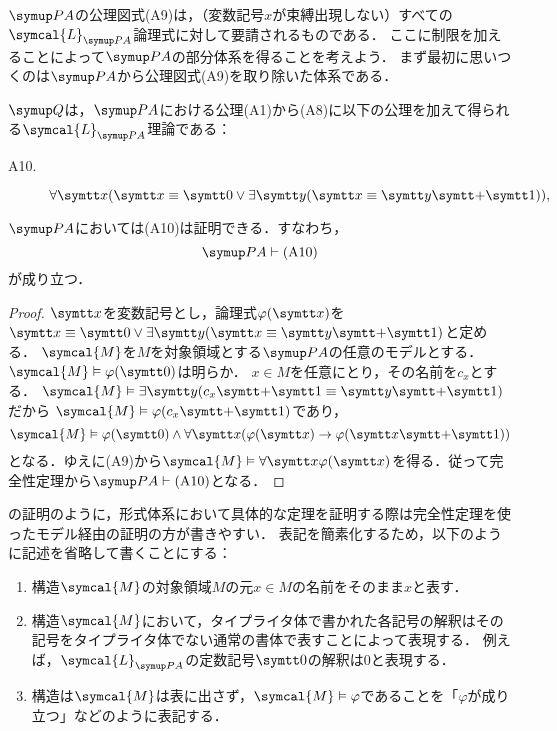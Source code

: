 \(\PA\)の公理図式(A9)は，（変数記号\(x\)が束縛出現しない）すべての\(\symcal{L}_{\PA}\)論理式に対して要請されるものである．
ここに制限を加えることによって\(\PA\)の部分体系を得ることを考えよう．
まず最初に思いつくのは\(\PA\)から公理図式(A9)を取り除いた体系である．

\begin{Def} \label{Def:robinsonarithmetic}
	\(\Robinson\)は，\(\PA\)における公理(A1)から(A8)に以下の公理を加えて得られる\(\symcal{L}_{\PA}\)理論である：
	\begin{description}
		\item[A10.] \(\forall \obj{x} \paren{\obj{x} \objeq \obj{0} \lor \exists \obj{y} \paren{\obj{x} \objeq \obj{y} \obj{+} \obj{1}}},\)
	\end{description}
\end{Def}

\begin{Lemma} \label{lemma:paa10redudant}
	\(\PA\)においては(A10)は証明できる．すなわち，
	\[
		\PA \provable \text{(A10)}
	\]
	が成り立つ．
\end{Lemma}

\begin{proof}
	\(\obj{x}\)を変数記号とし，論理式\(\apply{\varphi}{\obj{x}}\)を\(\obj{x} \objeq \obj{0} \lor \exists \obj{y} \paren{\obj{x} \objeq \obj{y} \obj{+} \obj{1}}\)と定める．
	\(\symcal{M}\)を\(M\)を対象領域とする\(\PA\)の任意のモデルとする．\(\symcal{M} \satisfy \apply{\varphi}{\obj{0}}\)は明らか．
	\(x \in M\)を任意にとり，その名前を\(c_x\)とする．
	\(\symcal{M} \satisfy \exists \obj{y} \paren{c_x \obj{+} \obj{1} \objeq \obj{y} \obj{+} \obj{1}}\)だから
	\(\symcal{M} \satisfy \apply{\varphi}{c_x \obj{+} \obj{1}}\)であり，
	\[
		\symcal{M} \satisfy \apply{\varphi}{\obj{0}} \land \forall \obj{x} \paren{\apply{\varphi}{\obj{x}} \to \apply{\varphi}{\obj{x} \obj{+} \obj{1}}}
	\]
	となる．ゆえに(A9)から\(\symcal{M} \satisfy \forall \obj{x} \apply{\varphi}{\obj{x}}\)を得る．従って完全性定理から\(\PA \provable \text{(A10)}\)となる．
\end{proof}

\begin{Note}
	の証明のように，形式体系において具体的な定理を証明する際は完全性定理を使ったモデル経由の証明の方が書きやすい．
	表記を簡素化するため，以下のように記述を省略して書くことにする：
	\begin{enumerate}
		\item 構造\(\symcal{M}\)の対象領域\(M\)の元\(x \in M\)の名前をそのまま\(x\)と表す．
		\item 構造\(\symcal{M}\)において，タイプライタ体で書かれた各記号の解釈はその記号をタイプライタ体でない通常の書体で表すことによって表現する．
		      例えば，\(\symcal{L}_{\PA}\)の定数記号\(\obj{0}\)の解釈は\(0\)と表現する．
		\item 構造は\(\symcal{M}\)は表に出さず，\(\symcal{M} \satisfy \varphi\)であることを「\(\varphi\)が成り立つ」などのように表記する．
	\end{enumerate}
\end{Note}


